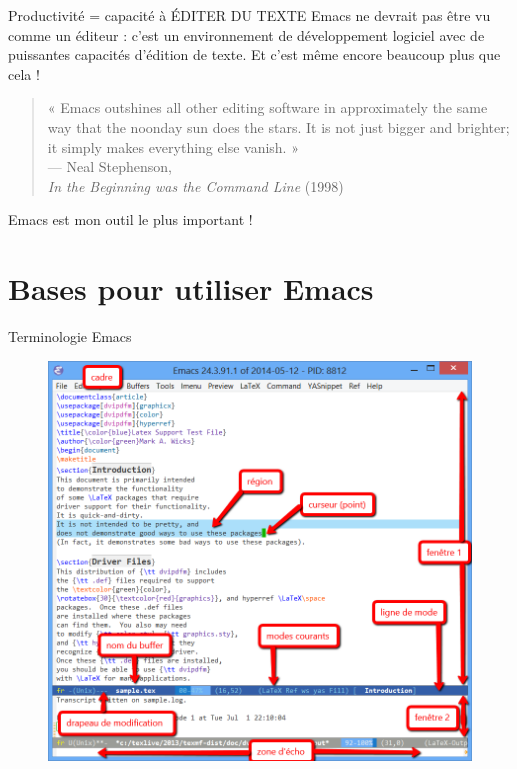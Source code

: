 \documentclass[t]{beamer}
\begin{document}
\begin{frame}[label={sec:org2de8d17}]{Productivité = capacité à ÉDITER DU TEXTE}
Emacs ne devrait pas être vu comme un éditeur : c'est un environnement de
développement logiciel avec de \alert{puissantes capacités d'édition de texte}. Et
c'est même encore beaucoup plus que cela !

\begin{quote}
« Emacs outshines all other editing software in approximately the same way that
the noonday sun does the stars. It is not just bigger and brighter; it simply
makes everything else vanish. » \\
--- Neal Stephenson, \\
\emph{In the Beginning was the Command Line} (1998)
\end{quote}

Emacs est mon outil \alert{le plus important} !
\end{frame}

\section{Bases pour utiliser Emacs}
\label{sec:orgb26e3e9}

\begin{frame}[label={sec:org4e9fdbe}]{Terminologie Emacs}
\begin{figure}[!htbp]
\centering
\includegraphics[width=.65\linewidth]{images/emacs-labeled.png}
\end{figure}
\end{frame}
\end{document}
